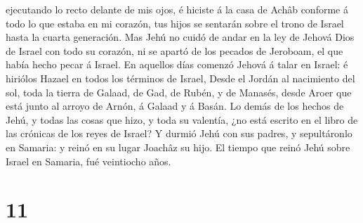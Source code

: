 ejecutando lo recto delante de mis ojos, é hiciste á la casa de Achâb
conforme á todo lo que estaba en mi corazón, tus hijos se sentarán sobre
el trono de Israel hasta la cuarta generación.  Mas Jehú
no cuidó de andar en la ley de Jehová Dios de Israel con todo su
corazón, ni se apartó de los pecados de Jeroboam, el que había hecho
pecar á Israel.  En aquellos días comenzó Jehová á talar
en Israel: é hiriólos Hazael en todos los términos de Israel,
 Desde el Jordán al nacimiento del sol, toda la tierra de
Galaad, de Gad, de Rubén, y de Manasés, desde Aroer que está junto al
arroyo de Arnón, á Galaad y á Basán.  Lo demás de los
hechos de Jehú, y todas las cosas que hizo, y toda su valentía, ¿no está
escrito en el libro de las crónicas de los reyes de Israel?
 Y durmió Jehú con sus padres, y sepultáronlo en Samaria:
y reinó en su lugar Joachâz su hijo.  El tiempo que reinó
Jehú sobre Israel en Samaria, fué veintiocho años.

\hypertarget{section-10}{%
\section{11}\label{section-10}}

